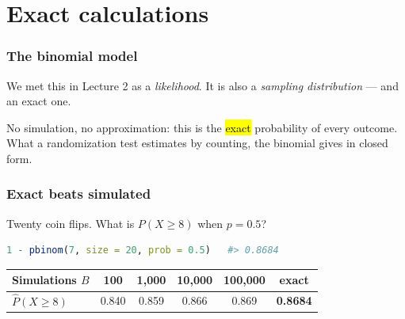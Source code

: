 \documentclass[slidestop,compress,mathserif]{beamer}
\begin{document}
\section{Exact calculations}
\begin{frame}
\frametitle{The binomial model}

We met this in Lecture 2 as a \emph{likelihood}. It is also a \emph{sampling distribution} --- and an exact one.

\vspace{0.2em}

\vspace{0.2em}
No simulation, no approximation: this is the \hl{exact} probability of every outcome. What a randomization test estimates by counting, the binomial gives in closed form.

\end{frame}

\begin{frame}[fragile]
\frametitle{Exact beats simulated}

Twenty coin flips. What is $P(X \ge 8)$ when $p = 0.5$?

\begin{lstlisting}[language=R]
1 - pbinom(7, size = 20, prob = 0.5)   #> 0.8684
\end{lstlisting}

\vspace{-0.3em}
{\footnotesize
\begin{center}
\begin{tabular}{lccccc}
\toprule
Simulations $B$ & 100 & 1{,}000 & 10{,}000 & 100{,}000 & \textbf{exact} \\
\midrule
$\widehat{P}(X \ge 8)$ & 0.840 & 0.859 & 0.866 & 0.869 & \textbf{0.8684} \\
\bottomrule
\end{tabular}
\end{center}}

\vspace{-0.2em}

\end{frame}
\end{document}
